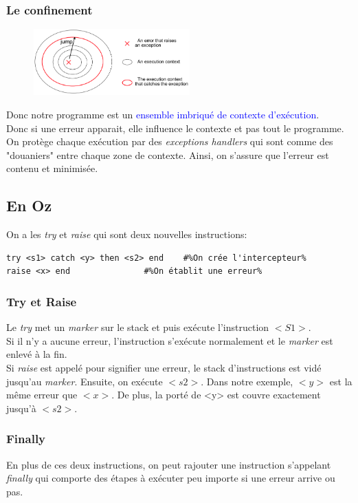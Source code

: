\documentclass{report}
\begin{document}
\subsubsection{Le confinement}
\begin{figure}
\centering
\includegraphics[width=6cm]{img/handler.png}
\end{figure}
Donc notre programme est un \textcolor{blue}{ensemble imbriqué de contexte d'exécution}.\\
Donc si une erreur apparait, elle influence le contexte et pas tout le programme.\\
On protège chaque exécution par des \textit{exceptions handlers} qui sont comme des "douaniers" entre chaque zone de contexte. Ainsi, on s'assure que l'erreur est contenu et minimisée.

\subsection{En Oz}
On a les \textit{try} et \textit{raise} qui sont deux nouvelles instructions:
\begin{lstlisting}[escapechar=\%]
try <s1> catch <y> then <s2> end	#%On crée l'intercepteur%
raise <x> end				#%On établit une erreur%
\end{lstlisting}

\subsubsection{Try et Raise}
Le \textit{try} met un \textit{marker} sur le stack et puis exécute l'instruction $<S1>$.\\
Si il n'y a aucune erreur, l'instruction s'exécute normalement et le \textit{marker} est enlevé à la fin.\\
Si \textit{raise} est appelé pour signifier une erreur, le stack d'instructions est vidé jusqu'au \textit{marker}. Ensuite, on exécute $<s2>$. Dans notre exemple, $<y>$ est la même erreur que $<x>$. De plus, la porté de <y> est couvre exactement jusqu'à $<s2>$.

\subsubsection{Finally}
En plus de ces deux instructions, on peut rajouter une instruction s'appelant \textit{finally} qui comporte des étapes à exécuter peu importe si une erreur arrive ou pas.
\end{document}
